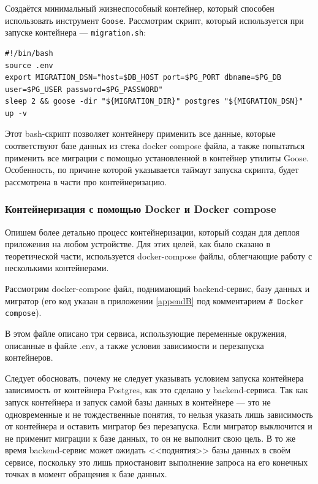 \documentclass[diploma]{SCWorks}
\begin{document}
Создаётся минимальный жизнеспособный контейнер, который способен
использовать инструмент \texttt{Goose}. Рассмотрим скрипт, который используется
при запуске контейнера — \texttt{migration.sh}:
\begin{verbatim}
#!/bin/bash
source .env
export MIGRATION_DSN="host=$DB_HOST port=$PG_PORT dbname=$PG_DB user=$PG_USER password=$PG_PASSWORD"
sleep 2 && goose -dir "${MIGRATION_DIR}" postgres "${MIGRATION_DSN}" up -v
\end{verbatim}

Этот bash-скрипт позволяет контейнеру применить все данные, 
которые соответствуют базе данных из стека docker compose файла, 
а также попытаться применить все 
миграции с помощью установленной в контейнер утилиты Goose. Особенность, 
по причине которой указывается таймаут запуска скрипта, будет рассмотрена в 
части про контейнеризацию.

\subsubsection{Контейнеризация с помощью Docker и Docker compose}

Опишем более детально процесс контейнеризации, который создан для деплоя 
приложения на любом устройстве. Для этих целей, как было сказано в 
теоретической части, используется docker-compose файлы, облегчающие работу с
несколькими контейнерами.

Рассмотрим docker-compose файл, поднимающий backend-сервис, базу данных и 
мигратор (его код указан в приложении \ref{appendB} под комментарием 
\texttt{\# Docker compose}).

В этом файле описано три сервиса, использующие переменные окружения, описанные
в файле .env, а также условия зависимости и перезапуска контейнеров.

Следует обосновать, почему не следует указывать условием запуска контейнера
зависимость от контейнера Postgres, как это сделано у backend-сервиса. Так как
запуск контейнера и запуск самой базы данных в контейнере — это не одновременные
и не тождественные понятия, то нельзя указать лишь зависимость от 
контейнера и оставить мигратор без перезапуска. Если мигратор выключится и не 
применит миграции к базе данных, то он не выполнит свою цель. В то же время
backend-сервис может ожидать <<поднятия>> базы данных в своём сервисе, поскольку
это лишь приостановит выполнение запроса на его конечных точках в момент 
обращения к базе данных.
\end{document}
